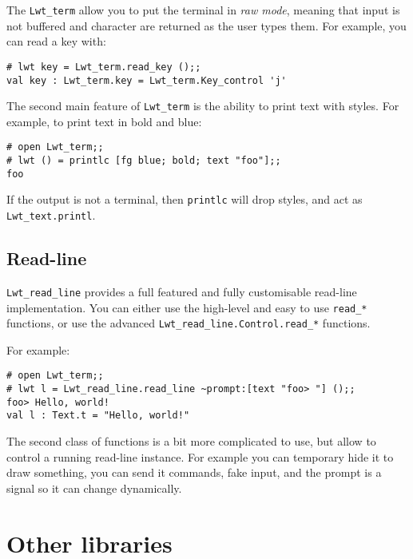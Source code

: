 The {\tt Lwt\_term} allow you to put the terminal in \emph{raw mode},
meaning that input is not buffered and character are
returned as the user types them. For example, you can read a key with:



\lstset{language=[Objective]Caml}\begin{lstlisting}
# lwt key = Lwt_term.read_key ();;
val key : Lwt_term.key = Lwt_term.Key_control 'j'
\end{lstlisting}
\medskip

\noindent
The second main feature of {\tt Lwt\_term} is the ability to print
text with styles. For example, to print text in bold and blue:



\lstset{language=[Objective]Caml}\begin{lstlisting}
# open Lwt_term;;
# lwt () = printlc [fg blue; bold; text "foo"];;
foo
\end{lstlisting}
\medskip

\noindent
If the output is not a terminal, then {\tt printlc} will drop
styles, and act as {\tt Lwt\_text.printl}.



\subsection{ Read-line }

{\tt Lwt\_read\_line} provides a full featured and fully
customisable read-line implementation. You can either use the
high-level and easy to use {\tt read\_*} functions, or use the
advanced {\tt Lwt\_read\_line.Control.read\_*} functions.



For example:



\lstset{language=[Objective]Caml}\begin{lstlisting}
# open Lwt_term;;
# lwt l = Lwt_read_line.read_line ~prompt:[text "foo> "] ();;
foo> Hello, world!
val l : Text.t = "Hello, world!"
\end{lstlisting}
\medskip

\noindent
The second class of functions is a bit more complicated to use, but
allow to control a running read-line instance. For example you can
temporary hide it to draw something, you can send it commands, fake
input, and the prompt is a signal so it can change dynamically.



\section{ Other libraries }

